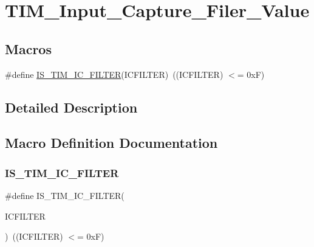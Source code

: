 \hypertarget{group___t_i_m___input___capture___filer___value}{}\section{T\+I\+M\+\_\+\+Input\+\_\+\+Capture\+\_\+\+Filer\+\_\+\+Value}
\label{group___t_i_m___input___capture___filer___value}
\subsection*{Macros}
\begin{DoxyCompactItemize}
\item 
\#define \mbox{\hyperlink{group___t_i_m___input___capture___filer___value_ga19ecc5fc2e1ce1697c3dbbb9809ca243}{I\+S\+\_\+\+T\+I\+M\+\_\+\+I\+C\+\_\+\+F\+I\+L\+T\+ER}}(I\+C\+F\+I\+L\+T\+ER)~((I\+C\+F\+I\+L\+T\+ER) $<$= 0x\+F)
\end{DoxyCompactItemize}


\subsection{Detailed Description}


\subsection{Macro Definition Documentation}
\mbox{\label{group___t_i_m___input___capture___filer___value_ga19ecc5fc2e1ce1697c3dbbb9809ca243}} 
\subsubsection{\texorpdfstring{IS\_TIM\_IC\_FILTER}{IS\_TIM\_IC\_FILTER}}
{\footnotesize\ttfamily \#define I\+S\+\_\+\+T\+I\+M\+\_\+\+I\+C\+\_\+\+F\+I\+L\+T\+ER(\begin{DoxyParamCaption}\item[{}]{I\+C\+F\+I\+L\+T\+ER }\end{DoxyParamCaption})~((I\+C\+F\+I\+L\+T\+ER) $<$= 0x\+F)}

